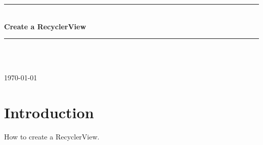 \documentclass[12pt]{article} %
\begin{document}

\begin{titlepage}

\newcommand{\HRule}{\rule{\linewidth}{0.5mm}} %

\center %

\HRule \\[0.4cm]
{ \huge \bfseries Create a RecyclerView}\\[0.4cm] %
\HRule \\[1.5cm]

\begin{minipage}{0.4\textwidth}
\end{minipage}\\[4cm]

{\large \today}\\[3cm] %


\vfill %

\end{titlepage}


\tableofcontents %

\newpage %


\section{Introduction} %

How to create a RecyclerView.
\end{document}
